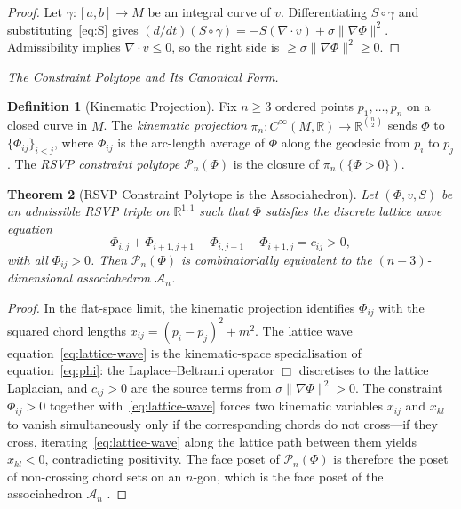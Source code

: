 \documentclass[12pt, oneside]{amsart}
\theoremstyle{plain}
\newtheorem{theorem}{Theorem}[section]
\theoremstyle{definition}
\newtheorem{definition}[theorem]{Definition}
\theoremstyle{remark}
\newcommand{\R}{\mathbb{R}}
\newcommand{\Phif}{\Phi}
\newcommand{\vf}{v}
\newcommand{\Sf}{S}
\newcommand{\Assoc}{\mathcal{A}_n}
\begin{document}
\begin{proof}
Let $\gamma: [a,b] \to M$ be an integral curve of $\vf$. Differentiating $\Sf \circ \gamma$ and substituting~\eqref{eq:S} gives $(d/dt)(\Sf \circ \gamma) = -\Sf(\nabla \cdot \vf) + \sigma\|\nabla\Phif\|^2$. Admissibility implies $\nabla \cdot \vf \leq 0$, so the right side is $\geq \sigma\|\nabla\Phif\|^2 \geq 0$.
\end{proof}

\medskip\noindent\textit{The Constraint Polytope and Its Canonical Form.}

\begin{definition}[Kinematic Projection]
Fix $n \geq 3$ ordered points $p_1, \ldots, p_n$ on a closed curve in $M$. The \emph{kinematic projection} $\pi_n: C^\infty(M,\R) \to \R^{\binom{n}{2}}$ sends $\Phif$ to $\{\Phif_{ij}\}_{i < j}$, where $\Phif_{ij}$ is the arc-length average of $\Phif$ along the geodesic from $p_i$ to $p_j$. The \emph{RSVP constraint polytope} $\mathcal{P}_n(\Phif)$ is the closure of $\pi_n(\{\Phif > 0\})$.
\end{definition}

\begin{theorem}[RSVP Constraint Polytope is the Associahedron]
\label{thm:assoc}
Let $(\Phif, \vf, \Sf)$ be an admissible RSVP triple on $\R^{1,1}$ such that $\Phif$ satisfies the discrete lattice wave equation
\begin{equation}
\label{eq:lattice-wave}
  \Phif_{i,j} + \Phif_{i+1,j+1} - \Phif_{i,j+1} - \Phif_{i+1,j} = c_{ij} > 0,
\end{equation}
with all $\Phif_{ij} > 0$. Then $\mathcal{P}_n(\Phif)$ is combinatorially equivalent to the $(n-3)$-dimensional associahedron $\Assoc$.
\end{theorem}

\begin{proof}
In the flat-space limit, the kinematic projection identifies $\Phif_{ij}$ with the squared chord lengths $x_{ij} = (p_i - p_j)^2 + m^2$. The lattice wave equation~\eqref{eq:lattice-wave} is the kinematic-space specialisation of equation~\eqref{eq:phi}: the Laplace--Beltrami operator $\Box$ discretises to the lattice Laplacian, and $c_{ij} > 0$ are the source terms from $\sigma\|\nabla\Phif\|^2 > 0$. The constraint $\Phif_{ij} > 0$ together with~\eqref{eq:lattice-wave} forces two kinematic variables $x_{ij}$ and $x_{kl}$ to vanish simultaneously only if the corresponding chords do not cross---if they cross, iterating~\eqref{eq:lattice-wave} along the lattice path between them yields $x_{kl} < 0$, contradicting positivity. The face poset of $\mathcal{P}_n(\Phif)$ is therefore the poset of non-crossing chord sets on an $n$-gon, which is the face poset of the associahedron $\Assoc$ \cite{Stasheff1963, Loday2004}.
\end{proof}
\end{document}
